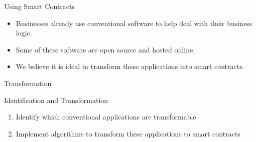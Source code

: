 \documentclass[xcolor=svgnames]{beamer}
\begin{document}
\begin{frame}{Using Smart Contracts}

\begin{itemize}
\item Businesses already use conventional software to help deal with their business logic.
\item Some of these software are open source and hosted online.
\item We believe it is ideal to transform these applications into smart contracts.
\end{itemize}

\end{frame}

\begin{frame}[t]{Transformation}

\begin{figure}
\centering

\end{figure}



\end{frame}


\begin{frame}{Identification and Transformation}

\begin{enumerate}
\item Identify which conventional applications are transformable

\item Implement algorithms to transform these applications to smart contracts
\end{enumerate}
\end{frame}
\end{document}
